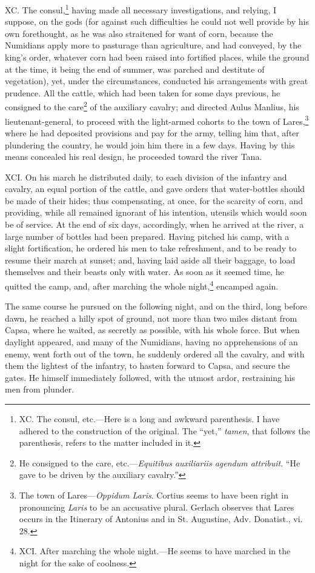 XC. The consul,\footnote{XC. The consul, etc.—Here is a long and awkward parenthesis.
I have adhered to the construction of the original. The ``yet,'' \emph{tamen},
that follows the parenthesis, refers to the matter included in it.} having made all necessary investigations, and
relying, I suppose, on the gods (for against such difficulties he
could not well provide by his own forethought, as he was also
straitened for want of corn, because the Numidians apply more to
pasturage than agriculture, and had conveyed, by the king's order,
whatever corn had been raised into fortified places, while the ground
at the time, it being the end of summer, was parched and destitute of
vegetation), yet, under the circumstances, conducted his arrangements
with great prudence. All the cattle, which had been taken for some
days previous, he consigned to the care\footnote{He consigned to the care, etc.—\emph{Equitibus auxiliariis agendum
attribuit}. ``He gave to be driven by the auxiliary cavalry.''} of the auxiliary cavalry;
and directed Aulus Manlius, his lieutenant-general, to proceed with
the light-armed cohorts to the town of Lares,\footnote{The town of Lares—\emph{Oppidum Laris}. Cortius seems to have
been right in pronouncing \emph{Laris} to be an accusative plural. Gerlach
observes that Lares occurs in the Itinerary of Antonius and in St.
Augustine, Adv. Donatist., vi. 28.} where he had
deposited provisions and pay for the army, telling him that, after
plundering the country, he would join him there in a few days. Having
by this means concealed his real design, he proceeded toward the river
Tana.

XCI. On his march he distributed daily, to each division of the
infantry and cavalry, an equal portion of the cattle, and gave orders
that water-bottles should be made of their hides; thus compensating,
at once, for the scarcity of corn, and providing, while all remained
ignorant of his intention, utensils which would soon be of service. At
the end of six days, accordingly, when he arrived at the river, a
large number of bottles had been prepared. Having pitched his camp,
with a slight fortification, he ordered his men to take refreshment,
and to be ready to resume their march at sunset; and, having laid aside
all their baggage, to load themselves and their beasts only with water.
As soon as it seemed time, he quitted the camp, and, after marching the
whole night,\footnote{XCI. After marching the whole night.—He seems to have
marched in the night for the sake of coolness.} encamped again.

The same course he pursued on the following night, and on the third,
long before dawn, he reached a hilly spot of ground, not more than two
miles distant from Capsa, where he waited, as secretly as possible,
with his whole force. But when daylight appeared, and many of the
Numidians, having no apprehensions of an enemy, went forth out of the
town, he suddenly ordered all the cavalry, and with them the lightest
of the infantry, to hasten forward to Capsa, and secure the gates. He
himself immediately followed, with the utmost ardor, restraining his
men from plunder.


